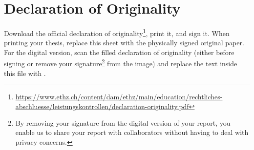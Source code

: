 \chapter*{Declaration of Originality}

 {\color{red}
  Download the official declaration of originality\footnote{\url{https://www.ethz.ch/content/dam/ethz/main/education/rechtliches-abschluesse/leistungskontrollen/declaration-originality.pdf}}, print it, and sign it.
  When printing your thesis, replace this sheet with the physically signed original paper.
  For the digital version, scan the filled declaration of originality (either before signing or remove your signature\footnote{%
	  By removing your signature from the digital version of your report, you enable us to share your report with collaborators without having to deal with privacy concerns.
  } from the image) and replace the text inside this file with \verb||.
 }
